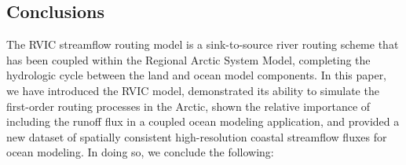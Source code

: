 \documentclass[jgrga, draft]{agutex}
\begin{document}
\begin{article}
\section{Conclusions}
\label{sec:conclusions}

The RVIC streamflow routing model is a sink-to-source river routing scheme that has been coupled within the Regional Arctic System Model, completing the hydrologic cycle between the land and ocean model components.
In this paper, we have introduced the RVIC model, demonstrated its ability to simulate the first-order routing processes in the Arctic, shown the relative importance of including the runoff flux in a coupled ocean modeling application, and provided a new dataset of spatially consistent high-resolution coastal streamflow fluxes for ocean modeling.
In doing so, we conclude the following:


\end{article}
\end{document}
